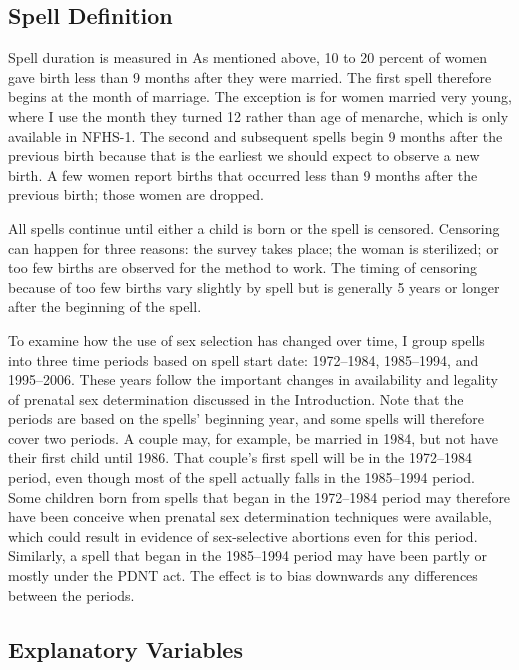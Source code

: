 \documentclass[12pt,letterpaper]{article}
\begin{document}
\subsection{Spell Definition\label{sec:spell_def}}

Spell duration is measured in 
As mentioned above, 10 to 20 percent of women gave birth less than 9 months
after they were married.
The first spell therefore begins at the month of marriage.
The exception is for women married very young, where I use the month they 
turned 12 rather than age of menarche, which is only available in NFHS-1.
The second and subsequent spells begin 9 months after the previous birth 
because that is the earliest we should expect to observe a new birth.
A few women report births that occurred less than 9 months 
after the previous birth; those women are dropped.

All spells continue until either a child is born or the spell is censored.
Censoring can happen for three reasons:
the survey takes place;
the woman is sterilized;
or too few births are observed for the method to work.
The timing of censoring because of too few births vary slightly by spell but 
is generally 5 years or longer after the beginning of the spell.

To examine how the use of sex selection has changed over time,
I group spells into three time periods based on spell start date:
1972--1984, 1985--1994, and 1995--2006.
These years follow the important changes in availability and legality of 
prenatal sex determination discussed in the Introduction.
Note that the periods are based on the spells' beginning year, and some spells 
will therefore cover two periods.
A couple may, for example, be married in 1984, but not have their first child until 1986.
That couple's first spell will be in the 1972--1984 period, even though most of the 
spell actually falls in the 1985--1994 period.
Some children born from spells that began in the 1972--1984 period may therefore have been
conceive when prenatal sex determination techniques were available, which could result
in evidence of sex-selective abortions even for this period.
Similarly, a spell that began in the 1985--1994 period may have been partly or mostly
under the PDNT act.
The effect is to bias downwards any differences between the periods.

\subsection{Explanatory Variables}
\end{document}
